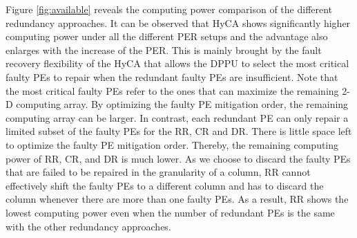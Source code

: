 Figure \ref{fig:available} reveals the computing power comparison of the different redundancy approaches. It can be observed that HyCA shows significantly higher computing power under all the different PER setups and the advantage also enlarges with the increase of the PER. This is mainly brought by the fault recovery flexibility of the HyCA that allows the DPPU to select the most critical faulty PEs to repair when the redundant faulty PEs are insufficient. Note that the most critical faulty PEs refer to the ones that can maximize the remaining 2-D computing array. By optimizing the faulty PE mitigation order, the remaining computing array can be larger. In contrast, each redundant PE can only repair a limited subset of the faulty PEs for the RR, CR and DR. There is little space left to optimize the faulty PE mitigation order. Thereby, the remaining computing power of RR, CR, and DR is much lower. As we choose to discard the faulty PEs that are failed to be repaired in the granularity of a column, RR cannot effectively shift the faulty PEs to a different column and has to discard the column whenever there are more than one faulty PEs. As a result, RR shows the lowest computing power even when the number of redundant PEs is the same with the other redundancy approaches.


